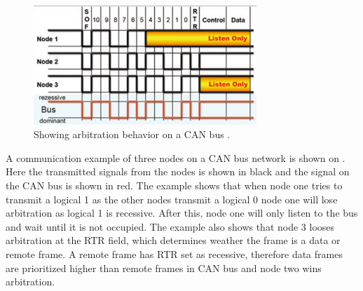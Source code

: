 \begin{figure}[H]
\centering
\includegraphics[width=0.75\textwidth]{rapport/billeder/CAN_arbitration}
\caption{Showing arbitration behavior on a CAN bus \cite{fig_CAN_arbitation}.}
\label{fig:CAN_arbitration}
\end{figure}

A communication example of three nodes on a CAN bus network is shown on . Here the transmitted signals from the nodes is shown in black and the signal on the CAN bus is shown in red. The example shows that when node one tries to transmit a logical 1 as the other nodes transmit a logical 0 node one will lose arbitration as logical 1 is recessive. After this, node one will only listen to the bus and wait until it is not occupied. The example also shows that node 3 looses arbitration at the RTR field, which determines weather the frame is a data or remote frame. A remote frame has RTR set as recessive, therefore data frames are prioritized higher than remote frames in CAN bus and node two wins arbitration.   














